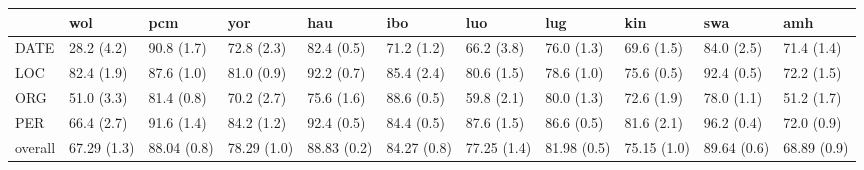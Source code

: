 \begin{tabular}{lllllllllll}
\toprule
{} &          wol &          pcm &          yor &          hau &          ibo &          luo &          lug &          kin &          swa &          amh \\
\midrule
DATE    &   28.2 (4.2) &   90.8 (1.7) &   72.8 (2.3) &   82.4 (0.5) &   71.2 (1.2) &   66.2 (3.8) &   76.0 (1.3) &   69.6 (1.5) &   84.0 (2.5) &   71.4 (1.4) \\
LOC     &   82.4 (1.9) &   87.6 (1.0) &   81.0 (0.9) &   92.2 (0.7) &   85.4 (2.4) &   80.6 (1.5) &   78.6 (1.0) &   75.6 (0.5) &   92.4 (0.5) &   72.2 (1.5) \\
ORG     &   51.0 (3.3) &   81.4 (0.8) &   70.2 (2.7) &   75.6 (1.6) &   88.6 (0.5) &   59.8 (2.1) &   80.0 (1.3) &   72.6 (1.9) &   78.0 (1.1) &   51.2 (1.7) \\
PER     &   66.4 (2.7) &   91.6 (1.4) &   84.2 (1.2) &   92.4 (0.5) &   84.4 (0.5) &   87.6 (1.5) &   86.6 (0.5) &   81.6 (2.1) &   96.2 (0.4) &   72.0 (0.9) \\
overall &  67.29 (1.3) &  88.04 (0.8) &  78.29 (1.0) &  88.83 (0.2) &  84.27 (0.8) &  77.25 (1.4) &  81.98 (0.5) &  75.15 (1.0) &  89.64 (0.6) &  68.89 (0.9) \\
\bottomrule
\end{tabular}
